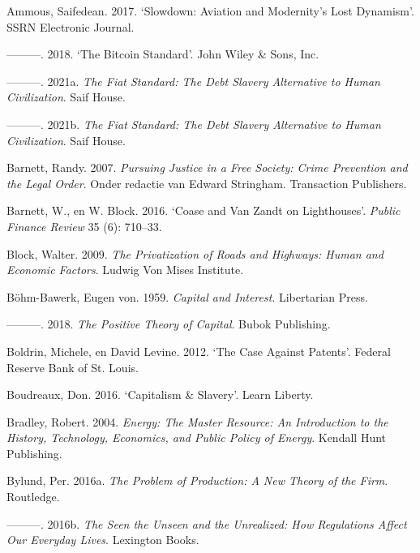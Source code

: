 \documentclass[
  a5paper,
  smalldemyvopaper,11pt,twoside,onecolumn,openright,extrafontsizes,
hidelinks]{memoir}
\newlength{\cslhangindent}
\newenvironment{CSLReferences}[2] %
 {\begin{list}{}{%
  \setlength{\itemindent}{0pt}
  \setlength{\leftmargin}{0pt}
  \setlength{\parsep}{0pt}
  \ifodd #1
   \setlength{\leftmargin}{\cslhangindent}
   \setlength{\itemindent}{-1\cslhangindent}
  \fi
  \setlength{\itemsep}{#2\baselineskip}}}
 {\end{list}}
\begin{document}
\label{refs}
\begin{CSLReferences}{1}{0}
Ammous, Saifedean. 2017. {`Slowdown: Aviation and Modernity's Lost
Dynamism'}. SSRN Electronic Journal.

---------. 2018. {`The Bitcoin Standard'}. John Wiley \& Sons, Inc.

---------. 2021a. \emph{The Fiat Standard: The Debt Slavery Alternative
to Human Civilization}. Saif House.

---------. 2021b. \emph{The Fiat Standard: The Debt Slavery Alternative
to Human Civilization}. Saif House.

Barnett, Randy. 2007. \emph{Pursuing Justice in a Free Society: Crime
Prevention and the Legal Order}. Onder redactie van Edward Stringham.
Transaction Publishers.

Barnett, W., en W. Block. 2016. {`Coase and Van Zandt on Lighthouses'}.
\emph{Public Finance Review} 35 (6): 710--33.

Block, Walter. 2009. \emph{The Privatization of Roads and Highways:
Human and Economic Factors}. Ludwig Von Mises Institute.

Böhm-Bawerk, Eugen von. 1959. \emph{Capital and Interest}. Libertarian
Press.

---------. 2018. \emph{The Positive Theory of Capital}. Bubok
Publishing.

Boldrin, Michele, en David Levine. 2012. {`The Case Against Patents'}.
Federal Reserve Bank of St. Louis.

Boudreaux, Don. 2016. {`Capitalism \& Slavery'}. Learn Liberty.

Bradley, Robert. 2004. \emph{Energy: The Master Resource: An
Introduction to the History, Technology, Economics, and Public Policy of
Energy}. Kendall Hunt Publishing.

Bylund, Per. 2016a. \emph{The Problem of Production: A New Theory of the
Firm}. Routledge.

---------. 2016b. \emph{The Seen the Unseen and the Unrealized: How
Regulations Affect Our Everyday Lives}. Lexington Books.


\end{CSLReferences}
\end{document}
